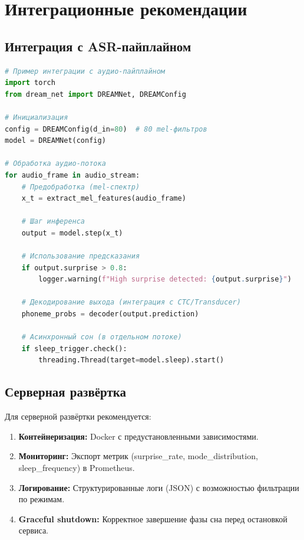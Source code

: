 \section{Интеграционные рекомендации}

\subsection{Интеграция с ASR-пайплайном}

\begin{lstlisting}[language=Python, caption={Пример интеграции с аудио-пайплайном}, label={lst:asr_integration}]
# Пример интеграции с аудио-пайплайном
import torch
from dream_net import DREAMNet, DREAMConfig

# Инициализация
config = DREAMConfig(d_in=80)  # 80 mel-фильтров
model = DREAMNet(config)

# Обработка аудио-потока
for audio_frame in audio_stream:
    # Предобработка (mel-спектр)
    x_t = extract_mel_features(audio_frame)

    # Шаг инференса
    output = model.step(x_t)

    # Использование предсказания
    if output.surprise > 0.8:
        logger.warning(f"High surprise detected: {output.surprise}")

    # Декодирование выхода (интеграция с CTC/Transducer)
    phoneme_probs = decoder(output.prediction)

    # Асинхронный сон (в отдельном потоке)
    if sleep_trigger.check():
        threading.Thread(target=model.sleep).start()
\end{lstlisting}

\subsection{Серверная развёртка}

Для серверной развёртки рекомендуется:

\begin{enumerate}
    \item \textbf{Контейнеризация:} Docker с предустановленными зависимостями.
    \item \textbf{Мониторинг:} Экспорт метрик (surprise\_rate, mode\_distribution, sleep\_frequency) в Prometheus.
    \item \textbf{Логирование:} Структурированные логи (JSON) с возможностью фильтрации по режимам.
    \item \textbf{Graceful shutdown:} Корректное завершение фазы сна перед остановкой сервиса.
\end{enumerate}

